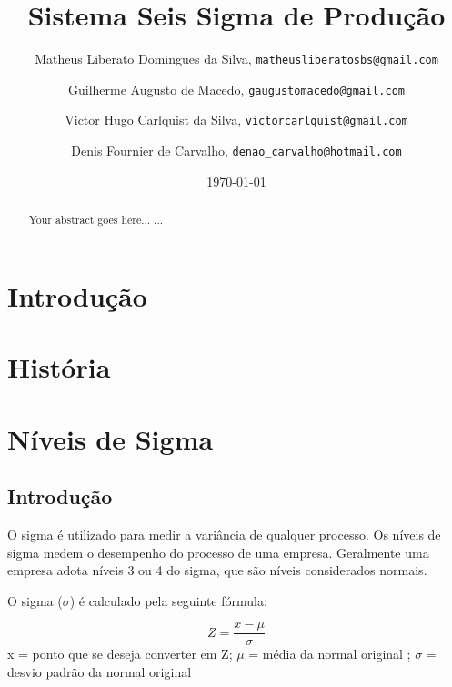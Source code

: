 \documentclass{abnt}
\author{
	Matheus Liberato Domingues da Silva, \texttt{matheusliberatosbs@gmail.com} \and
	Guilherme Augusto de Macedo, \texttt{gaugustomacedo@gmail.com} \and
	Victor Hugo Carlquist da Silva, \texttt{victorcarlquist@gmail.com} \and
	Denis Fournier de Carvalho, \texttt{denao\_carvalho@hotmail.com} 
}
\title{ Sistema Seis Sigma de Produção}
\date{\today}
\begin{document}
	\maketitle
	\tableofcontents

	\begin{abstract}
		Your abstract goes here...
		...
	\end{abstract}
	
	\chapter {Introdução}
	
	\chapter {História}
	
	\chapter {Níveis de Sigma}
		\section {Introdução}
			O sigma é utilizado para medir a variância de qualquer processo. Os níveis de sigma medem o desempenho do processo de uma empresa.
			Geralmente uma empresa adota níveis 3 ou 4 do sigma, que são níveis considerados normais.
			
			O sigma ($\sigma$) é calculado pela seguinte fórmula: 
			\begin{center}
			    \begin{equation}
			       Z = \frac{x - \mu}{\sigma}
		        \end{equation}
		     x = ponto que se deseja converter em Z; $\mu$ =  média da normal original ; $\sigma$ = desvio padrão da normal original
			\end{center}
			
			 
\end{document}
